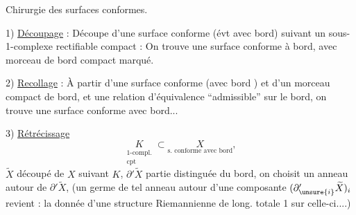 
Chirurgie des surfaces conformes.

1) \uline{Découpage} : Découpe d'une surface conforme  (évt avec bord) suivant un sous-1-complexe rectifiable compact : On trouve une surface conforme à  bord, avec morceau  de bord compact marqué.

2) \uline{Recollage} : À partir d'une surface conforme (avec bord ) et d'un morceau compact de bord, et une relation d'équivalence ``admissible''  sur le bord,  on trouve une surface conforme avec bord...

3) \uline{Rétrécissage}
\[
\underset{\substack{\text{1-compl.}\\\text{cpt}}}{K}\subset
\underset{\text{s. conforme avec bord}}{X},
\]
$\widetilde X$ découpé de $X$ suivant $K$, $\partial'\widetilde X$ partie distinguée du bord, on choisit un anneau autour de $\partial'\widetilde X$,  (un germe de tel anneau autour d'une composante $(\partial'_{\unsure{i}}\widetilde X)_i$ revient : la donnée d'une structure Riemannienne   de long. totale 1 sur celle-ci....)

